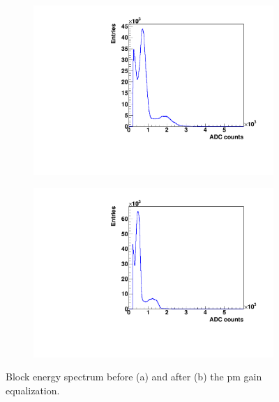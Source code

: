 \begin{figure} [!h]
\begin{subfigure}[t]{0.5\textwidth}
\centering
\includegraphics[width=1\textwidth]{03_GraphicFiles/chapter3_CLaRySproto/Absorber/images_charResults_Na22/1_Raw_energy_spectrum.pdf}
\caption{}
\label{chap3::fig::absRaw_Espectrum}
\end{subfigure}
\begin{subfigure}[t]{0.5\textwidth}
\centering
\includegraphics[width=1\textwidth]{03_GraphicFiles/chapter3_CLaRySproto/Absorber/images_charResults_Na22/2_Cal_energy_spectrum.pdf}
\caption{}
\label{chap3::fig::absCal_Espectrum}
\end{subfigure}
\caption{Block energy spectrum before (a) and after (b) the \gls{pm} gain equalization.}
\label{chap3::fig::absADCspectrum}
\end{figure}

